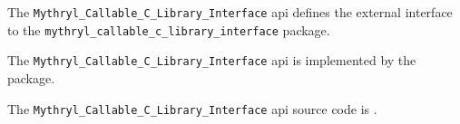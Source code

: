 The {\tt Mythryl\_Callable\_C\_Library\_Interface} api defines the external interface to the {\tt mythryl\_callable\_c\_library\_interface} package.

The {\tt Mythryl\_Callable\_C\_Library\_Interface} api is implemented by the  package.

The {\tt Mythryl\_Callable\_C\_Library\_Interface} api source code is .
